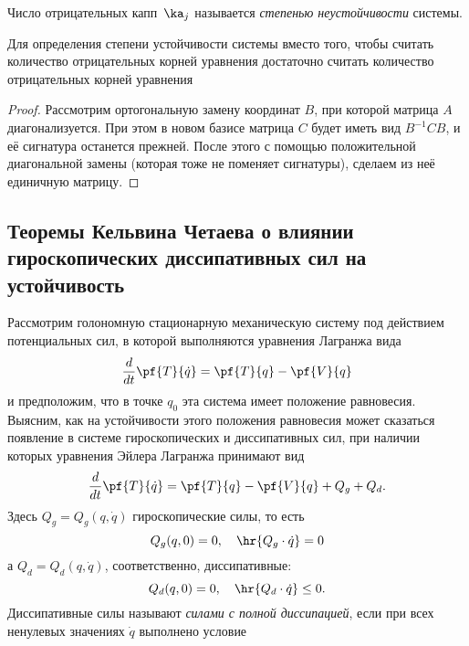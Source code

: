 \documentclass[a4paper,12pt]{article}
\newcommand{\tdf}[1]{\textsl{#1}}
\newcommand{\spr}[2]{\hr{#1 \cdot #2}}
\newcommand{\eql}[2]{\begin{equation}\label{#2}#1\end{equation}}
\begin{document}
\begin{df}
Число отрицательных капп~$\ka_j$ называется \tdf{степенью неустойчивости}
системы.
\end{df}
\begin{stm}
\label{stm::signature}
Для определения степени устойчивости системы вместо того, чтобы считать количество
отрицательных корней уравнения
достаточно считать количество отрицательных корней уравнения
\end{stm}
\begin{proof}
Рассмотрим ортогональную замену координат $B$, при которой матрица $A$ диагонализуется.
При этом в новом базисе матрица $C$ будет иметь вид $B^{-1} CB$, и её сигнатура останется
прежней. После этого с помощью положительной диагональной замены (которая тоже не поменяет сигнатуры),
сделаем из неё единичную матрицу.
\end{proof}
\subsection{Теоремы Кельвина Четаева о влиянии гироскопических диссипативных сил на устойчивость}

Рассмотрим голономную стационарную механическую систему под действием потенциальных сил, в которой
выполняются уравнения Лагранжа вида \eql{\frac{d}{dt}\pf{T}{\dot{q}}=\pf{T}{q}-\pf{V}{q}}{La} и
предположим, что в точке $q_0$ эта система имеет положение равновесия. Выясним, как на устойчивости
этого положения равновесия может сказаться появление в системе гироскопических и диссипативных сил,
при наличии которых уравнения Эйлера Лагранжа принимают вид
\eql{\frac{d}{dt}\pf{T}{\dot{q}}=\pf{T}{q}-\pf{V}{q}+Q_g+Q_d.}{Lgd} Здесь $Q_g=Q_g(q,\dot{q})$
гироскопические силы, то есть
\eql{Q_g(q,0)=0,\quad\spr{Q_g}{\dot{q}}=0}{g_eq,} а
$Q_d=Q_d(q,\dot{q})$, соответственно, диссипативные:
\eql{Q_d(q,0)=0,\quad \spr{Q_d}{\dot{q}}\le0.}{d_eq}
Диссипативные силы называют \tdf{силами с полной диссипацией}, если при
всех ненулевых значениях $\dot{q}$ выполнено условие
\equ{\spr{Q_d}{\dot{q}}<0.}
\end{document}

